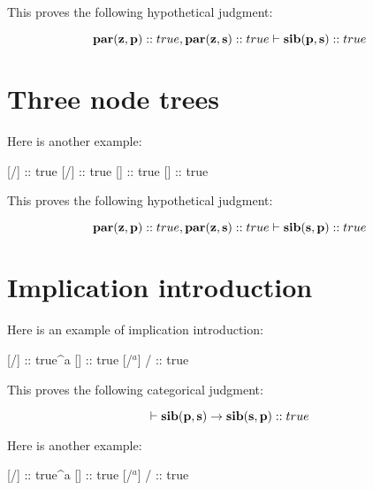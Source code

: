 \documentclass[../../../main.tex]{subfiles}
\begin{document}
\noindent
This proves the following hypothetical judgment:

\begin{equation*}
  \nd{par(z, p)} :: true, \nd{par(z, s)} :: true \ndturnstile/ \nd{sib(p, s)} :: true
\end{equation*}


\section{Three node trees}

Here is another example:

\begin{prooftree*}
  \hypo{}
  [\startrule/]{ :: true}
  \hypo{}
  [\startrule/]{ :: true}
  []{ :: true}
  []{ :: true}
\end{prooftree*}

\noindent
This proves the following hypothetical judgment:

\begin{equation*}
  \nd{par(z, p)} :: true, \nd{par(z, s)} :: true \ndturnstile/ \nd{sib(s, p)} :: true
\end{equation*}


\section{Implication introduction}

Here is an example of implication introduction:

\begin{prooftree*}
  \hypo{}
  [\startrule/]{ :: true^{a}}
  []{ :: true}
  [\implIntro/$^{a}$]{ \impl/  :: true}
\end{prooftree*}

\noindent
This proves the following categorical judgment:

\begin{equation*}
  \ndturnstile/ \nd{sib(p, s)} \impl/ \nd{sib(s, p)} :: true
\end{equation*}

\noindent
Here is another example:

\begin{prooftree*}
  \hypo{}
  [\startrule/]{ :: true^{a}}
  []{ :: true}
  [\implIntro/$^{a}$]{ \impl/  :: true}
\end{prooftree*}
\end{document}
